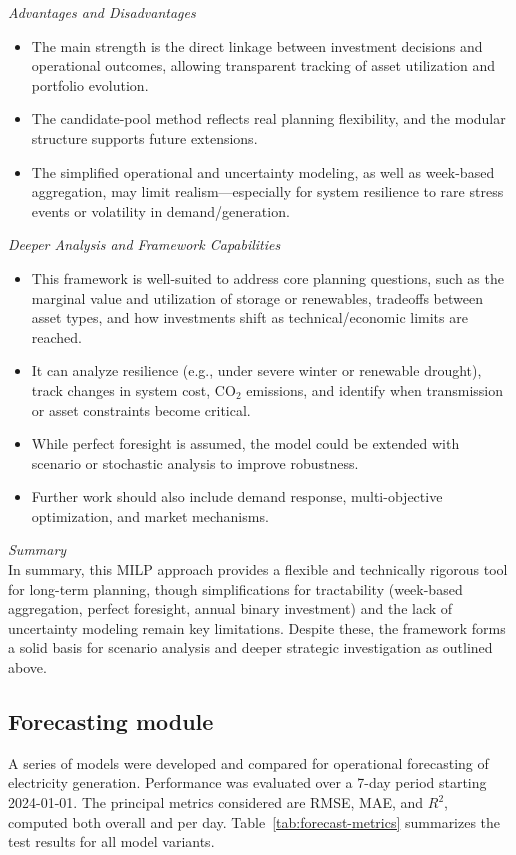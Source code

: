 \textit{Advantages and Disadvantages}
\vspace{-0.4em}
\begin{itemize}
    \item The main strength is the direct linkage between investment decisions and operational outcomes, 
    allowing transparent tracking of asset utilization and portfolio evolution. 
    \item The candidate-pool method reflects real planning flexibility, and the modular structure 
    supports future extensions. 
    \item The simplified operational and uncertainty modeling, as well as week-based aggregation, 
    may limit realism—especially for system resilience to rare stress events or volatility in demand/generation.
\end{itemize}

\textit{Deeper Analysis and Framework Capabilities}
\vspace{-0.4em}
\begin{itemize}
    \item This framework is well-suited to address core planning questions, such as the marginal 
    value and utilization of storage or renewables, tradeoffs between asset types, and how investments 
    shift as technical/economic limits are reached. 
    \item It can analyze resilience (e.g., under severe winter or renewable drought), track changes 
    in system cost, CO$_2$ emissions, and identify when transmission or asset constraints become critical. 
    \item While perfect foresight is assumed, the model could be extended with scenario or stochastic 
    analysis to improve robustness. 
    \item Further work should also include demand response, multi-objective optimization, and market 
    mechanisms.
\end{itemize}

\textit{Summary}\\
In summary, this MILP approach provides a flexible and technically rigorous tool for long-term planning, 
though simplifications for tractability (week-based aggregation, perfect foresight, annual binary investment) 
and the lack of uncertainty modeling remain key limitations. Despite these, the framework forms a solid basis 
for scenario analysis and deeper strategic investigation as outlined above.

\subsection{Forecasting module}
A series of models were developed and compared for operational forecasting of electricity generation. 
Performance was evaluated over a 7-day period starting 2024-01-01. The principal metrics considered are RMSE, 
MAE, and $R^2$, computed both overall and per day. Table~\ref{tab:forecast-metrics} summarizes the test results 
for all model variants.

